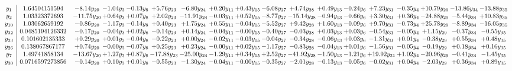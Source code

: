 \documentclass[9pt]{article}
\begin{document}
\[\begin{array}{c| c c@{\hskip 2pt} c@{\hskip 2pt} c@{\hskip 2pt} c@{\hskip 2pt} c@{\hskip 2pt} c@{\hskip 2pt} c@{\hskip 2pt} c@{\hskip 2pt} c@{\hskip 2pt} c@{\hskip 2pt} c@{\hskip 2pt} c@{\hskip 2pt} c@{\hskip 2pt} c@{\hskip 2pt} c@{\hskip 2pt} c@{\hskip 2pt} }
 y_{1}   &  1.64504151594 & -8.14 y_{20} & -1.04 y_{3} & -0.13 y_{8} & +  5.76 y_{23} & -6.80 y_{24} & +  0.20 y_{11} & +  0.43 y_{15} & -6.08 y_{27} & +  4.74 y_{28} & +  0.49 y_{13} & -0.24 y_{6} & +  7.23 y_{31} & -0.35 y_{4} & + 10.79 y_{29} & -13.86 y_{34} & -13.88 y_{35}\\
 y_{2}   &  1.03323372693 & -11.75 y_{20} & +  0.64 y_{3} & +  0.07 y_{8} & +  2.02 y_{23} & -11.91 y_{24} & -0.03 y_{11} & +  0.52 y_{15} & -8.77 y_{27} & -15.14 y_{28} & -0.94 y_{13} & -0.66 y_{6} & +  3.30 y_{31} & +  0.36 y_{4} & -24.88 y_{29} & -5.44 y_{34} & + 10.83 y_{35}\\
 y_{10}   &  1.03062659192 & -0.86 y_{20} & -1.17 y_{3} & -0.14 y_{8} & +  0.40 y_{23} & +  1.75 y_{24} & +  0.55 y_{11} & -0.04 y_{15} & -5.52 y_{27} & +  9.42 y_{28} & +  1.60 y_{13} & -0.09 y_{6} & +  9.70 y_{31} & -0.73 y_{4} & + 25.78 y_{29} & -8.89 y_{34} & -16.05 y_{35}\\
 y_{32}   &  0.0485194126332 & -0.17 y_{20} & -0.04 y_{3} & +  0.02 y_{8} & -0.14 y_{23} & +  0.14 y_{24} & -0.04 y_{11} & -0.00 y_{15} & -0.40 y_{27} & -0.03 y_{28} & +  0.03 y_{13} & +  0.03 y_{6} & -0.54 y_{31} & -0.05 y_{4} & +  1.15 y_{29} & -0.37 y_{34} & -0.55 y_{35}\\
 y_{33}   &  0.101602135333 & +  0.29 y_{20} & +  0.01 y_{3} & -0.04 y_{8} & -0.22 y_{23} & +  0.00 y_{24} & -0.02 y_{11} & -0.03 y_{15} & -0.04 y_{27} & -0.34 y_{28} & -0.06 y_{13} & +  0.03 y_{6} & -1.31 y_{31} & +  0.01 y_{4} & -0.38 y_{29} & +  0.55 y_{34} & +  0.48 y_{35}\\
 y_{26}   &  0.138067867177 & +  0.74 y_{20} & -0.00 y_{3} & -0.07 y_{8} & +  0.25 y_{23} & +  0.23 y_{24} & -0.00 y_{11} & +  0.02 y_{15} & -1.17 y_{27} & -0.83 y_{28} & -0.04 y_{13} & +  0.01 y_{6} & -1.56 y_{31} & -0.05 y_{4} & -0.19 y_{29} & +  0.18 y_{34} & +  0.16 y_{35}\\
 y_{7}   &  1.49741858134 & -13.67 y_{20} & +  1.27 y_{3} & +  0.87 y_{8} & -17.88 y_{23} & -25.00 y_{24} & -1.29 y_{11} & +  0.34 y_{15} & +  2.52 y_{27} & -41.92 y_{28} & -1.50 y_{13} & -1.21 y_{6} & + 19.92 y_{31} & +  1.02 y_{4} & -20.96 y_{29} & -0.41 y_{34} & -1.45 y_{35}\\
 y_{30}   &  0.0716597273856 & -0.14 y_{20} & +  0.10 y_{3} & +  0.01 y_{8} & -0.55 y_{23} & -1.30 y_{24} & -0.04 y_{11} & -0.00 y_{15} & -0.35 y_{27} & -2.01 y_{28} & -0.13 y_{13} & -0.05 y_{6} & -0.02 y_{31} & +  0.04 y_{4} & -2.03 y_{29} & +  0.36 y_{34} & +  0.89 y_{35}\\

\end{array}\]
\end{document}
